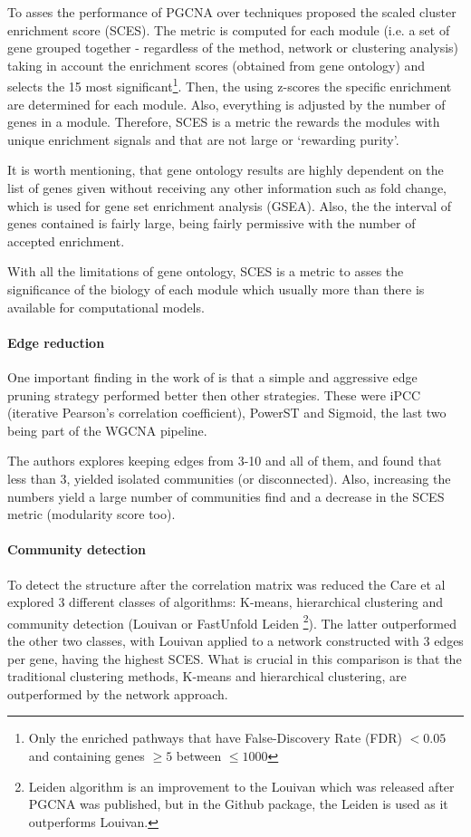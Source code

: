 To asses the performance of PGCNA over techniques \citet{Care2019-ij} proposed the scaled cluster enrichment score (SCES). The metric is computed for each module (i.e. a set of gene grouped together - regardless of the method, network or clustering analysis) taking in account the enrichment scores (obtained from gene ontology) and selects the 15 most significant\footnote{Only the enriched pathways that have False-Discovery Rate (FDR) $<0.05$ and containing genes $\geq5$ between $\leq1000$}. Then, the using z-scores the specific enrichment are determined for each module. Also, everything is adjusted by the number of genes in a module. Therefore, SCES is a metric the rewards the modules with unique enrichment signals and that are not large or ‘rewarding purity'\cite{Care2019-ij}.

It is worth mentioning, that gene ontology results are highly dependent on the list of genes given without receiving any other information such as fold change, which is used for gene set enrichment analysis (GSEA). Also, the the interval of genes contained is fairly large, being fairly permissive with the number of accepted enrichment.

With all the limitations of gene ontology, SCES is a metric to asses the significance of the biology of each module which usually more than there is available for computational models.

\paragraph*{Edge reduction}

One important finding in the work of \citet{Care2019-ij} is that a simple and aggressive edge pruning strategy performed better then other strategies. These were iPCC (iterative Pearson’s correlation coefficient), PowerST and Sigmoid, the last two being part of the WGCNA pipeline.

The authors explores keeping edges from 3-10 and all of them, and found that less than 3, yielded isolated communities (or disconnected). Also, increasing the numbers yield a large number of communities find and a decrease in the SCES metric (modularity score too).

\paragraph*{Community detection}

To detect the structure after the correlation matrix was reduced the Care et al explored 3 different classes of algorithms: K-means, hierarchical clustering and community detection (Louivan\citet{Blondel2008-ik} or FastUnfold Leiden \citet{Traag2019-ne}\footnote{Leiden algorithm is an improvement to the Louivan which was released after PGCNA was published, but in the Github package, the Leiden is used as it outperforms Louivan.}). The latter outperformed the other two classes, with Louivan applied to a network constructed with 3 edges per gene, having the highest SCES. What is crucial in this comparison is that the traditional clustering methods, K-means and hierarchical clustering, are outperformed by the network approach.

